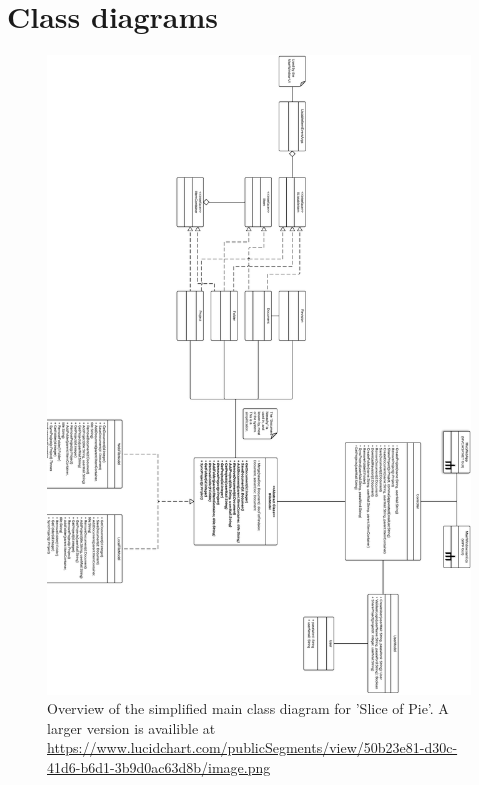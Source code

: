 \section{Class diagrams}
\label{sec:class-diagrams-appendix}

\begin{figure}[H]
    \begin{center}
        \includegraphics[width=1\textwidth]{Software_design/graphics/mainClassDiagram.png}
        \caption{Overview of the simplified main class diagram for 'Slice of Pie'. A larger version is availible at \url{https://www.lucidchart.com/publicSegments/view/50b23e81-d30c-41d6-b6d1-3b9d0ac63d8b/image.png}}
        \label{fig:design-class_diagram} 
    \end{center}
\end{figure}


